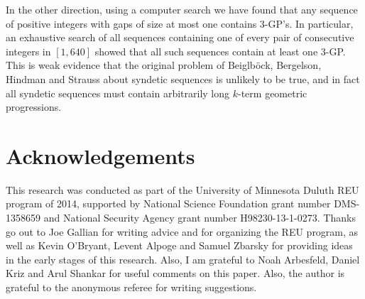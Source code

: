 \documentclass[12pt,english,BCOR7.5mm]{amsart}
\numberwithin{equation}{section}
\numberwithin{figure}{section}
\theoremstyle{definition}
\theoremstyle{plain}
\theoremstyle{plain}
\theoremstyle{plain}
\theoremstyle{definition}
\theoremstyle{plain}
\theoremstyle{plain}
\begin{document}
In the other direction, using a computer search we have found that
any sequence of positive integers with gaps of size at most one contains
$3$-GP's. In particular, an exhaustive search of all sequences containing
one of every pair of consecutive integers in $[1,640]$ showed that
all such sequences contain at least one $3$-GP. This is weak evidence
that the original problem of Beiglböck, Bergelson, Hindman and Strauss
about syndetic sequences is unlikely to be true, and in fact all syndetic
sequences must contain arbitrarily long $k$-term geometric progressions. 

\section*{Acknowledgements}

This research was conducted as part of the University of Minnesota
Duluth REU program of 2014, supported by National Science Foundation
grant number DMS-1358659 and National Security Agency grant number
H98230-13-1-0273. Thanks go out to Joe Gallian for writing advice
and for organizing the REU program, as well as Kevin O'Bryant, Levent
Alpoge and Samuel Zbarsky for providing ideas in the early stages
of this research. Also, I am grateful to Noah Arbesfeld, Daniel Kriz
and Arul Shankar for useful comments on this paper. Also, the author
is grateful to the anonymous referee for writing suggestions.
\end{document}
